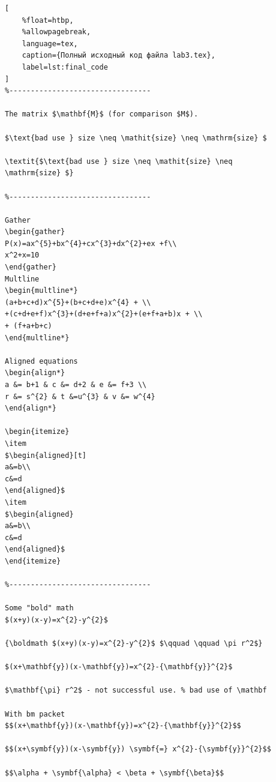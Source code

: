 \documentclass[a4paper, 12pt]{article}
\begin{document}
\begin{lstlisting}[
    %float=htbp, 
    %allowpagebreak,
    language=tex,
    caption={Полный исходный код файла lab3.tex}, 
    label=lst:final_code
]
%---------------------------------

The matrix $\mathbf{M}$ (for comparison $M$).

$\text{bad use } size \neq \mathit{size} \neq \mathrm{size} $

\textit{$\text{bad use } size \neq \mathit{size} \neq
\mathrm{size} $}

%---------------------------------

Gather
\begin{gather}
P(x)=ax^{5}+bx^{4}+cx^{3}+dx^{2}+ex +f\\
x^2+x=10
\end{gather}
Multline
\begin{multline*}
(a+b+c+d)x^{5}+(b+c+d+e)x^{4} + \\
+(c+d+e+f)x^{3}+(d+e+f+a)x^{2}+(e+f+a+b)x + \\
+ (f+a+b+c)
\end{multline*}

Aligned equations
\begin{align*}
a &= b+1 & c &= d+2 & e &= f+3 \\
r &= s^{2} & t &=u^{3} & v &= w^{4}
\end{align*}

\begin{itemize}
\item
$\begin{aligned}[t]
a&=b\\
c&=d
\end{aligned}$
\item
$\begin{aligned}
a&=b\\
c&=d
\end{aligned}$
\end{itemize}

%---------------------------------

Some "bold" math
$(x+y)(x-y)=x^{2}-y^{2}$

{\boldmath $(x+y)(x-y)=x^{2}-y^{2}$ $\qquad \qquad \pi r^2$}

$(x+\mathbf{y})(x-\mathbf{y})=x^{2}-{\mathbf{y}}^{2}$

$\mathbf{\pi} r^2$ - not successful use. % bad use of \mathbf

With bm packet
$$(x+\mathbf{y})(x-\mathbf{y})=x^{2}-{\mathbf{y}}^{2}$$

$$(x+\symbf{y})(x-\symbf{y}) \symbf{=} x^{2}-{\symbf{y}}^{2}$$

$$\alpha + \symbf{\alpha} < \beta + \symbf{\beta}$$


\end{lstlisting}
\end{document}
